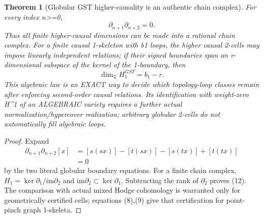 \documentclass[11pt]{article}
\newcommand{\Q}{\mathbb Q}
\newtheorem{theorem}{Theorem}
\begin{document}
\begin{theorem}[Globular GST higher-causality is an authentic chain complex]
For every index n>=0,
\[
 \boxed{\partial_{n+1}\partial_{n+2}=0.}          \tag{11}
\]
Thus all finite higher-causal dimensions can be
made into a rational chain complex.
For a finite causal 1-skeleton with b1 loops,
the higher causal 2-cells may impose linearly
independent relations; if their signed
boundaries span an r-dimensional subspace
of the kernel of the 1-boundary, then
\[
 \boxed{\dim_\Q H_1^{GST}=b_1-r.}                 \tag{12}
\]
This algebraic law is an EXACT way to
decide which topology-loop classes remain
after enforcing second-order causal relations.
Its identification with weight-zero
H^1 of an ALGEBRAIC variety requires
a further actual normalization/hypercover
realization; arbitrary globular 2-cells
do not automatically fill algebraic loops.
\end{theorem}
\begin{proof}
Expand
\[
 \begin{aligned}
 \partial_{n+1}\partial_{n+2}[x]
 &=[s(sx)]-[t(sx)]-[s(tx)]+[t(tx)]\\
 &=0
 \end{aligned}
\]
by the two literal globular boundary equations.
For a finite chain complex,
\(H_1=\ker\partial_1/\mathrm{im}\partial_2\)
and \(\mathrm{im}\partial_2\subset\ker\partial_1\).
Subtracting the rank of \(\partial_2\)
proves (12). The comparison with actual
mixed Hodge cohomology is warranted only
for geometrically certified cells;
equations (8),(9) give that certification
for point-pinch graph 1-skeleta.
\end{proof}
\end{document}

